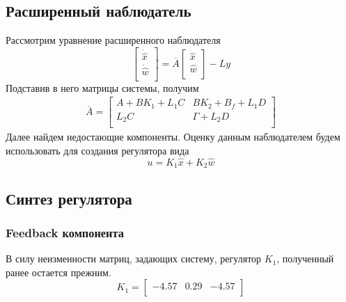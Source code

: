 \subsection{Расширенный наблюдатель}
Рассмотрим уравнение расширенного наблюдателя 
\begin{equation}
    \begin{bmatrix}
        \dot{\hat{x}} \\ 
        \dot{\hat{w}} \\
    \end{bmatrix} = \overline{A} 
    \begin{bmatrix}
        \hat{x} \\ 
        \hat{w} \\
    \end{bmatrix} - Ly
    \label{eq:extended_observer}
\end{equation}
Подставив в него матрицы системы, получим
\begin{eqnarray}
    \overline{A} = \begin{bmatrix}
       A + BK_1 + L_1 C & BK_2 + B_f + L_1 D \\ 
       L_2 C & \Gamma + L_2 D \\
    \end{bmatrix}
\end{eqnarray}
Далее найдем недостающие компоненты. Оценку данным наблюдателем будем 
использовать для создания регулятора вида 
\begin{equation}
    u = K_1 \hat{x} + K_2 \hat{w} 
\end{equation}

\subsection{Синтез регулятора}
\subsubsection{Feedback компонента}
В силу неизменности матриц, задающих систему, регулятор $K_1$, 
полученный ранее остается прежним. 
\begin{equation}
    K_1 = \begin{bmatrix}
        -4.57  & 0.29  & -4.57 \\ 
    \end{bmatrix}
\end{equation}
